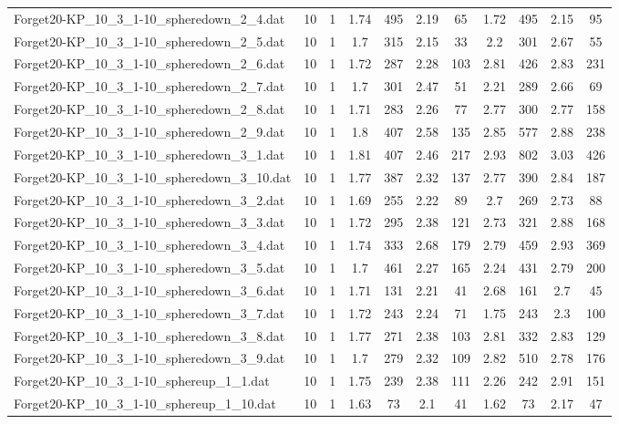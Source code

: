 \begin{table}[!ht]
\begin{tabular}{lcccccccccc}
Forget20-KP\_10\_3\_1-10\_spheredown\_2\_4.dat & 10 & 1 & 1.74 & 495 & 2.19 & 65 & 1.72 & 495 & 2.15 & 95 \\
Forget20-KP\_10\_3\_1-10\_spheredown\_2\_5.dat & 10 & 1 & 1.7 & 315 & 2.15 & 33 & 2.2 & 301 & 2.67 & 55 \\
Forget20-KP\_10\_3\_1-10\_spheredown\_2\_6.dat & 10 & 1 & 1.72 & 287 & 2.28 & 103 & 2.81 & 426 & 2.83 & 231 \\
Forget20-KP\_10\_3\_1-10\_spheredown\_2\_7.dat & 10 & 1 & 1.7 & 301 & 2.47 & 51 & 2.21 & 289 & 2.66 & 69 \\
Forget20-KP\_10\_3\_1-10\_spheredown\_2\_8.dat & 10 & 1 & 1.71 & 283 & 2.26 & 77 & 2.77 & 300 & 2.77 & 158 \\
Forget20-KP\_10\_3\_1-10\_spheredown\_2\_9.dat & 10 & 1 & 1.8 & 407 & 2.58 & 135 & 2.85 & 577 & 2.88 & 238 \\
Forget20-KP\_10\_3\_1-10\_spheredown\_3\_1.dat & 10 & 1 & 1.81 & 407 & 2.46 & 217 & 2.93 & 802 & 3.03 & 426 \\
Forget20-KP\_10\_3\_1-10\_spheredown\_3\_10.dat & 10 & 1 & 1.77 & 387 & 2.32 & 137 & 2.77 & 390 & 2.84 & 187 \\
Forget20-KP\_10\_3\_1-10\_spheredown\_3\_2.dat & 10 & 1 & 1.69 & 255 & 2.22 & 89 & 2.7 & 269 & 2.73 & 88 \\
Forget20-KP\_10\_3\_1-10\_spheredown\_3\_3.dat & 10 & 1 & 1.72 & 295 & 2.38 & 121 & 2.73 & 321 & 2.88 & 168 \\
Forget20-KP\_10\_3\_1-10\_spheredown\_3\_4.dat & 10 & 1 & 1.74 & 333 & 2.68 & 179 & 2.79 & 459 & 2.93 & 369 \\
Forget20-KP\_10\_3\_1-10\_spheredown\_3\_5.dat & 10 & 1 & 1.7 & 461 & 2.27 & 165 & 2.24 & 431 & 2.79 & 200 \\
Forget20-KP\_10\_3\_1-10\_spheredown\_3\_6.dat & 10 & 1 & 1.71 & 131 & 2.21 & 41 & 2.68 & 161 & 2.7 & 45 \\
Forget20-KP\_10\_3\_1-10\_spheredown\_3\_7.dat & 10 & 1 & 1.72 & 243 & 2.24 & 71 & 1.75 & 243 & 2.3 & 100 \\
Forget20-KP\_10\_3\_1-10\_spheredown\_3\_8.dat & 10 & 1 & 1.77 & 271 & 2.38 & 103 & 2.81 & 332 & 2.83 & 129 \\
Forget20-KP\_10\_3\_1-10\_spheredown\_3\_9.dat & 10 & 1 & 1.7 & 279 & 2.32 & 109 & 2.82 & 510 & 2.78 & 176 \\
Forget20-KP\_10\_3\_1-10\_sphereup\_1\_1.dat & 10 & 1 & 1.75 & 239 & 2.38 & 111 & 2.26 & 242 & 2.91 & 151 \\
Forget20-KP\_10\_3\_1-10\_sphereup\_1\_10.dat & 10 & 1 & 1.63 & 73 & 2.1 & 41 & 1.62 & 73 & 2.17 & 47 \\

\end{tabular}
\end{table}
